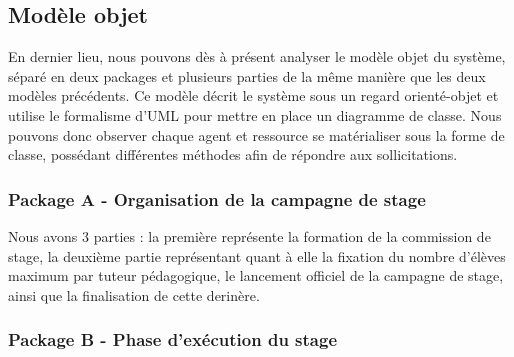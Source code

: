 \documentclass[12pt,a4paper]{article}
\begin{document}
{
    \newpage {} 
    
    \restoregeometry {} \newpage
}

{
    \newpage {} 
    
    \restoregeometry {} \newpage
}

{
    \newpage {} 
    
    \restoregeometry {} \newpage
}

\subsection{Modèle objet}

En dernier lieu, nous pouvons dès à présent analyser le modèle objet du système,
séparé en deux packages et plusieurs parties de la même manière que les deux
modèles précédents. Ce modèle décrit le système sous un regard orienté-objet
et utilise le formalisme d'UML pour mettre en place un diagramme de classe. Nous
pouvons donc observer chaque agent et ressource se matérialiser sous la forme de
classe, possédant différentes méthodes afin de répondre aux sollicitations.

\subsubsection{Package A - Organisation de la campagne de stage}

Nous avons 3 parties : la première représente la formation de la commission de
stage, la deuxième partie représentant quant à elle la fixation du nombre
d'élèves maximum par tuteur pédagogique, le lancement officiel de la campagne de
stage, ainsi que la finalisation de cette derinère.

{
    \tiny
    \newpage {} 
    
    \restoregeometry {} \newpage
}

{
    \newpage {} 
    
    \restoregeometry {} \newpage
}

\subsubsection{Package B - Phase d'exécution du stage}
\end{document}

